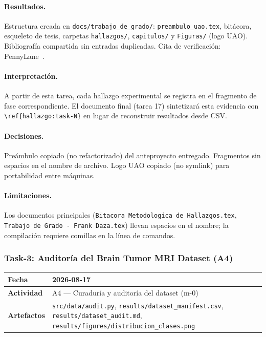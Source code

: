 \paragraph{Resultados.}
Estructura creada en \texttt{docs/trabajo\_de\_grado/}:
\texttt{preambulo\_uao.tex}, bitácora, esqueleto de tesis, carpetas \texttt{hallazgos/},
\texttt{capitulos/} y \texttt{Figuras/} (logo UAO).
Bibliografía compartida sin entradas duplicadas.
Cita de verificación: PennyLane~\cite{bergholm2018pennylane}.

\paragraph{Interpretación.}
A partir de esta tarea, cada hallazgo experimental se registra en el fragmento de fase
correspondiente. El documento final (tarea 17) sintetizará esta evidencia con
\texttt{\textbackslash ref\{hallazgo:task-N\}} en lugar de reconstruir resultados desde CSV.

\paragraph{Decisiones.}
Preámbulo copiado (no refactorizado) del anteproyecto entregado.
Fragmentos sin espacios en el nombre de archivo.
Logo UAO copiado (no symlink) para portabilidad entre máquinas.

\paragraph{Limitaciones.}
Los documentos principales (\texttt{Bitacora Metodologica de Hallazgos.tex},
\texttt{Trabajo de Grado - Frank Daza.tex}) llevan espacios en el nombre;
la compilación requiere comillas en la línea de comandos.

\subsubsection{Task-3: Auditoría del Brain Tumor MRI Dataset (A4)}
\label{hallazgo:task-3}
\begin{tabularx}{\textwidth}{|l|X|}\hline
\textbf{Fecha} & 2026-08-17 \\\hline
\textbf{Actividad} & A4 --- Curaduría y auditoría del dataset (m-0) \\\hline
\textbf{Artefactos} & \texttt{src/data/audit.py}, \texttt{results/dataset\_manifest.csv}, \texttt{results/dataset\_audit.md}, \texttt{results/figures/distribucion\_clases.png} \\\hline
\end{tabularx}

